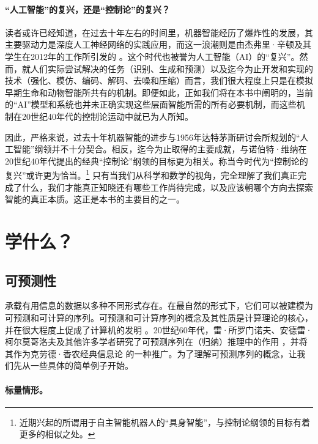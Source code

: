 \documentclass[../../book-main_zh.tex]{subfiles}
\begin{document}
\paragraph{“人工智能”的复兴，还是“控制论”的复兴？}
读者或许已经知道，在过去十年左右的时间里，机器智能经历了爆炸性的发展，其主要驱动力是深度人工神经网络的实践应用，而这一浪潮则是由杰弗里·辛顿及其学生在2012年的工作所引发的 \cite{krizhevsky2012imagenet}。这个时代也被誉为人工智能（AI）的“复兴”。然而，就人们实际尝试解决的任务（识别、生成和预测）以及迄今为止开发和实现的技术（强化、模仿、编码、解码、去噪和压缩）而言，我们很大程度上只是在模拟早期生命和动物智能所共有的机制。即便如此，正如我们将在本书中阐明的，当前的“AI”模型和系统也并未正确实现这些层面智能所需的所有必要机制，而这些机制在20世纪40年代的控制论运动中就已为人所知。

因此，严格来说，过去十年机器智能的进步与1956年达特茅斯研讨会所规划的“人工智能”纲领并不十分契合。相反，迄今为止取得的主要成就，与诺伯特·维纳在20世纪40年代提出的经典“控制论”纲领的目标更为相关。称当今时代为“控制论的复兴”或许更为恰当。\footnote{近期兴起的所谓用于自主智能机器人的“具身智能”，与控制论纲领的目标有着更多的相似之处。} 只有当我们从科学和数学的视角，完全理解了我们真正完成了什么，我们才能真正知晓还有哪些工作尚待完成，以及应该朝哪个方向去探索智能的真正本质。这正是本书的主要目的之一。


\section{学什么？}
\label{sec:what-to-learn}



\subsection{可预测性}
\label{sec:predictability}
承载有用信息的数据以多种不同形式存在。在最自然的形式下，它们可以被建模为可预测和可计算的序列。可预测和可计算序列的概念及其性质是计算理论的核心，并在很大程度上促成了计算机的发明 \cite{Turing-1936}。20世纪60年代，雷·所罗门诺夫、安德雷·柯尔莫哥洛夫及其他许多学者研究了可预测序列在（归纳）推理中的作用 \cite{Kolmogorov1998OnTO}，并将其作为克劳德·香农经典信息论 \cite{Shannon-1948} 的一种推广。为了理解可预测序列的概念，让我们先从一些具体的简单例子开始。
\paragraph{标量情形。}
\end{document}
